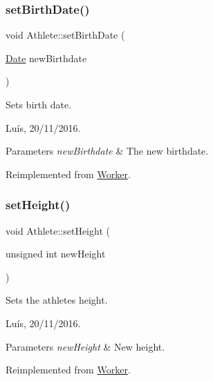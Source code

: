 \subsubsection{\texorpdfstring{set\+Birth\+Date()}{setBirthDate()}}
{\footnotesize\ttfamily void Athlete\+::set\+Birth\+Date (\begin{DoxyParamCaption}\item[{\hyperlink{class_date}{Date}}]{new\+Birthdate }\end{DoxyParamCaption})\hspace{0.3cm}{\ttfamily [virtual]}}



Sets birth date. 

Luís, 20/11/2016. 


\begin{DoxyParams}{Parameters}
{\em new\+Birthdate} & The new birthdate. \\
\hline
\end{DoxyParams}


Reimplemented from \hyperlink{class_worker_ac48a8315ccdeb2913cd98ea223660f72}{Worker}.

\hypertarget{class_athlete_ab96f3138f984bb830aa69f1502961dc8}{}\label{class_athlete_ab96f3138f984bb830aa69f1502961dc8} 
\subsubsection{\texorpdfstring{set\+Height()}{setHeight()}}
{\footnotesize\ttfamily void Athlete\+::set\+Height (\begin{DoxyParamCaption}\item[{unsigned int}]{new\+Height }\end{DoxyParamCaption})\hspace{0.3cm}{\ttfamily [virtual]}}



Sets the athlete\textquotesingle{}s height. 

Luís, 20/11/2016. 


\begin{DoxyParams}{Parameters}
{\em new\+Height} & New height. \\
\hline
\end{DoxyParams}


Reimplemented from \hyperlink{class_worker_a64124dca31baa9b110779c7698c15a57}{Worker}.

\hypertarget{class_athlete_a4c7813bb2b52b7095cb7e85aef2e54d5}{}\label{class_athlete_a4c7813bb2b52b7095cb7e85aef2e54d5} 
